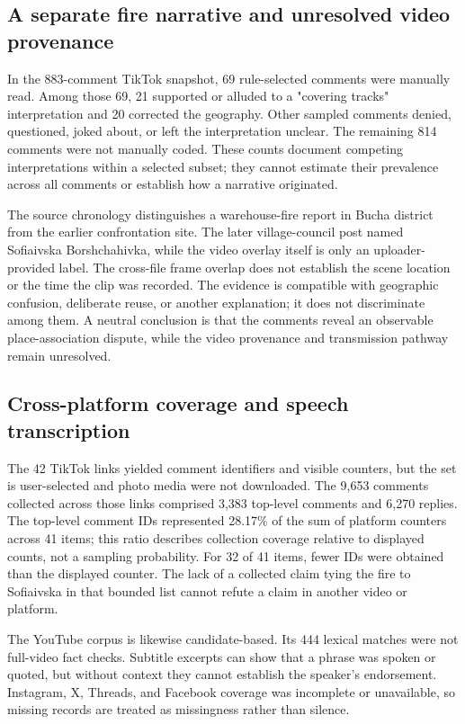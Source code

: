 \subsection{A separate fire narrative and unresolved video provenance}

In the 883-comment TikTok snapshot, 69 rule-selected comments were manually read. Among those 69, 21 supported or alluded to a "covering tracks" interpretation and 20 corrected the geography. Other sampled comments denied, questioned, joked about, or left the interpretation unclear. The remaining 814 comments were not manually coded. These counts document competing interpretations within a selected subset; they cannot estimate their prevalence across all comments or establish how a narrative originated.

The source chronology distinguishes a warehouse-fire report in Bucha district from the earlier confrontation site. The later village-council post named Sofiaivska Borshchahivka, while the video overlay itself is only an uploader-provided label. The cross-file frame overlap does not establish the scene location or the time the clip was recorded. The evidence is compatible with geographic confusion, deliberate reuse, or another explanation; it does not discriminate among them. A neutral conclusion is that the comments reveal an observable place-association dispute, while the video provenance and transmission pathway remain unresolved.

\subsection{Cross-platform coverage and speech transcription}

The 42 TikTok links yielded comment identifiers and visible counters, but the set is user-selected and photo media were not downloaded. The 9,653 comments collected across those links comprised 3,383 top-level comments and 6,270 replies. The top-level comment IDs represented 28.17\% of the sum of platform counters across 41 items; this ratio describes collection coverage relative to displayed counts, not a sampling probability. For 32 of 41 items, fewer IDs were obtained than the displayed counter. The lack of a collected claim tying the fire to Sofiaivska in that bounded list cannot refute a claim in another video or platform.

The YouTube corpus is likewise candidate-based. Its 444 lexical matches were not full-video fact checks. Subtitle excerpts can show that a phrase was spoken or quoted, but without context they cannot establish the speaker's endorsement. Instagram, X, Threads, and Facebook coverage was incomplete or unavailable, so missing records are treated as missingness rather than silence.

